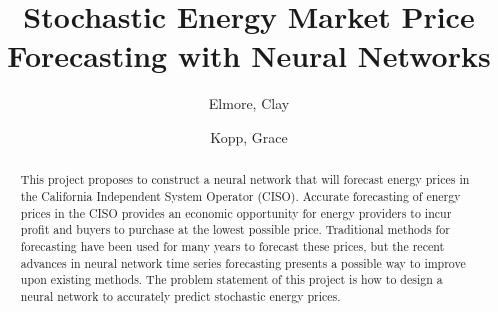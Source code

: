 \documentclass[sigconf]{acmart}
\begin{document}
%
\title{Stochastic Energy Market Price Forecasting with Neural Networks}

%

\author{Elmore, Clay}

\author{Kopp, Grace}
%
\renewcommand{\shortauthors}{Elmore and Kopp, et al.}

\begin{abstract}
This project proposes to construct a neural network that will forecast energy prices in the California Independent System Operator (CISO). Accurate forecasting of energy prices in the CISO provides an economic opportunity for energy providers to incur profit and buyers to purchase at the lowest possible price. Traditional methods for forecasting have been used for many years to forecast these prices, but the recent advances in neural network time series forecasting presents a possible way to improve upon existing methods. The problem statement of this project is how to design a neural network to accurately predict stochastic energy prices.
\end{abstract}
\end{document}
